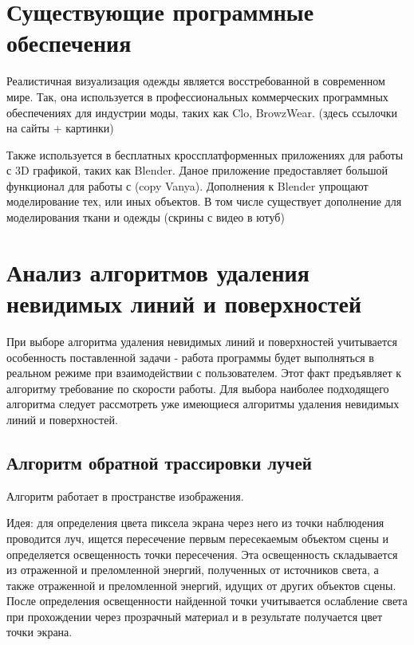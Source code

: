 

\section{Существующие программные обеспечения}

Реалистичная визуализация одежды является восстребованной в современном мире.
Так, она используется в профессиональных коммерческих программных обеспечениях
для индустрии моды, таких как Clo, BrowzWear. (здесь ссылочки на сайты + картинки)

Также используется в бесплатных кроссплатформенных приложениях для работы с 3D
графикой, таких как Blender. Даное приложение предоставляет большой функционал
для работы с (copy Vanya). Дополнения к Blender упрощают моделирование тех, или
иных объектов. В том числе существует дополнение для моделирования ткани и одежды
(скрины с видео в ютуб)

\section{Анализ алгоритмов удаления невидимых линий и поверхностей}

При выборе алгоритма удаления невидимых линий и поверхностей учитывается особенность поставленной задачи - работа программы будет выполняться в реальном режиме при взаимодействии с пользователем. Этот факт предъявляет к алгоритму требование по скорости работы. Для выбора наиболее подходящего алгоритма следует рассмотреть уже имеющиеся алгоритмы удаления невидимых линий и поверхностей.

\subsection{Алгоритм обратной трассировки лучей}
Алгоритм работает в пространстве изображения\cite{raytr}.

Идея: для определения цвета пиксела экрана через него из точки наблюдения проводится луч, ищется пересечение первым пересекаемым объектом сцены и определяется освещенность точки пересечения. Эта освещенность складывается из отраженной и преломленной энергий, полученных от источников света, а также отраженной и преломленной энергий, идущих от других объектов сцены. После определения освещенности найденной точки учитывается ослабление света при прохождении через прозрачный материал и в результате получается цвет точки экрана.

